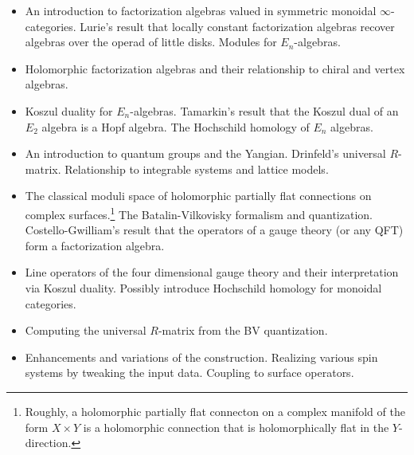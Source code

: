 \documentclass[10pt]{article}
\begin{document}
\begin{itemize}
\item An introduction to factorization algebras valued in symmetric monoidal $\infty$-categories. Lurie's result that locally constant factorization algebras recover algebras over the operad of little disks.
Modules for $E_n$-algebras.\cite{CG1, LurieHA, AFTopMan}
\item Holomorphic factorization algebras and their relationship to chiral and vertex algebras. \cite{CG1, BD}
\item Koszul duality for $E_n$-algebras.
Tamarkin's \cite{Tamarkin} result that the Koszul dual of an $E_2$ algebra is a Hopf algebra.
The Hochschild homology of $E_n$ algebras.
\item An introduction to quantum groups and the Yangian.
Drinfeld's universal $R$-matrix. \cite{Etingof, ChariPressley}
Relationship to integrable systems and lattice models.
\item The classical moduli space of holomorphic partially flat connections on complex surfaces.\footnote{Roughly, a holomorphic partially flat connecton on a complex manifold of the form $X \times Y$ is a holomorphic connection that is holomorphically flat in the $Y$-direction.}
The Batalin-Vilkovisky formalism and quantization.
Costello-Gwilliam's result that the operators of a gauge theory (or any QFT) form a factorization algebra. \cite{CosBook, CG2, CosYangian}
\item Line operators of the four dimensional gauge theory and their interpretation via Koszul duality.
Possibly introduce Hochschild homology for monoidal categories. 
\item Computing the universal $R$-matrix from the BV quantization. 
\item Enhancements and variations of the construction. 
Realizing various spin systems by tweaking the input data. 
Coupling to surface operators. 
\end{itemize}



%

%  

\end{document}

